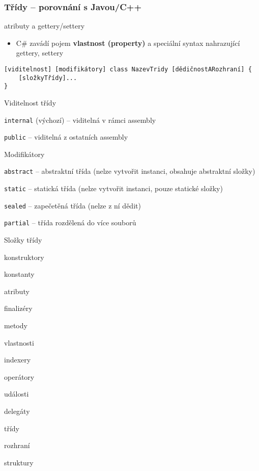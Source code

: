 \begin{frame}[fragile]
\frametitle{Třídy -- porovnání s Javou/C++}
\begin{bitemize}{}
\item atributy a gettery/settery
\begin{itemize}
\item C\# zavádí pojem \textbf{vlastnost (property)} a speciální syntax nahrazující gettery, settery
\end{itemize}
\end{bitemize}
\end{frame}






\begin{frame}[fragile]
\begin{noteblock}{}
\begin{lstlisting}
[viditelnost] [modifikátory] class NazevTridy [dědičnostARozhraní] { 
	[složkyTřídy]...
}
\end{lstlisting}
\end{noteblock}
\begin{bitemize}{Viditelnost třídy}
\item \lstinline|internal| (výchozí) -- viditelná v rámci assembly
\item \lstinline|public| -- viditelná z ostatních assembly
\end{bitemize}

\begin{bitemize}{Modifikátory}
\item \lstinline|abstract| -- abstraktní třída (nelze vytvořit instanci, obsahuje abstraktní složky)
\item \lstinline|static| -- statická třída (nelze vytvořit instanci, pouze statické složky)
\item \lstinline|sealed| -- zapečetěná třída (nelze z ní dědit)
\item \lstinline|partial| -- třída rozdělená do více souborů
\end{bitemize}
\end{frame}




\begin{frame}[fragile]
\begin{bitemize}{Složky třídy}
\item konstruktory
\item konstanty
\item atributy
\item finalizéry
\item metody
\item vlastnosti
\item indexery
\item operátory
\item události
\item delegáty
\item třídy
\item rozhraní
\item struktury
\end{bitemize}
\end{frame}



